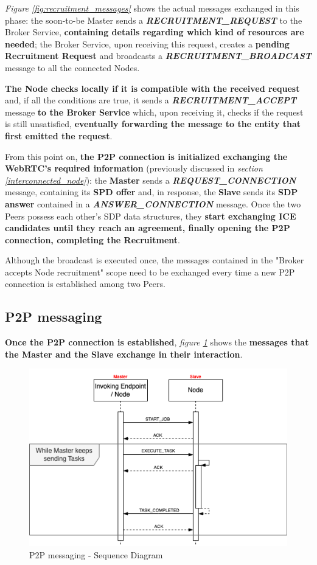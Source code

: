 \textit{Figure \ref{fig:recruitment_messages}} shows the actual messages exchanged in this phase: the soon-to-be Master sends a \textbf{\textit{RECRUITMENT\_REQUEST}} to the Broker Service, \textbf{containing details regarding which kind of resources are needed}; the Broker Service, upon receiving this request, creates a \textbf{pending Recruitment Request} and broadcasts a \textbf{\textit{RECRUITMENT\_BROADCAST}} message to all the connected Nodes.

\textbf{The Node checks locally if it is compatible with the received request} and, if all the conditions are true, it sends a \textit{\textbf{RECRUITMENT\_ACCEPT}} message \textbf{to the Broker Service} which, upon receiving it, checks if the request is still unsatisfied, \textbf{eventually forwarding the message to the entity that first emitted the request}.

From this point on, \textbf{the P2P connection is initialized exchanging the WebRTC's required information} (previously discussed in \textit{section \ref{interconnected_node}}): the \textbf{Master} sends a \textbf{\textit{REQUEST\_CONNECTION}} message, containing its \textbf{SPD offer} and, in response, the \textbf{Slave} sends its \textbf{SDP answer} contained in a \textbf{\textit{ANSWER\_CONNECTION}} message. Once the two Peers possess each other's SDP data structures, they \textbf{start exchanging ICE candidates until they reach an agreement, finally opening the P2P connection, completing the Recruitment}.

Although the broadcast is executed once, the messages contained in the "Broker accepts Node recruitment" scope need to be exchanged every time a new P2P connection is established among two Peers.

\subsection{P2P messaging}
\textbf{Once the P2P connection is established}, \textit{figure \ref{fig:p2p_messages}} shows the \textbf{messages that the Master and the Slave exchange in their interaction}.

\begin{figure}[!ht]
    \centering
    \includegraphics[scale=0.61]{document/chapters/chapter_7/images/p2p_messages.png}
    \caption{P2P messaging - Sequence Diagram}
    \label{fig:p2p_messages}
\end{figure}

